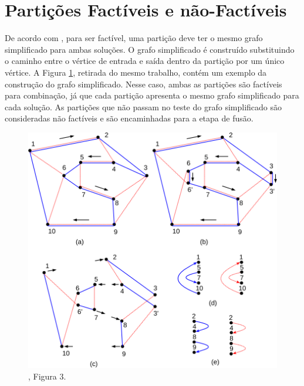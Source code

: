 \documentclass[
	article,			%
	11pt,				%
	oneside,			%
	a4paper,			%
	english,			%
	brazil,				%
	sumario=tradicional
	]{abntex2}
\begin{document}

\frenchspacing 


%
%
\maketitle


\textual

\section{Partições Factíveis e não-Factíveis}

De acordo com , para ser factível, uma partição deve ter o mesmo grafo simplificado para ambas soluções. O grafo simplificado é construído substituindo o caminho entre o vértice de entrada e saída dentro da partição por um único vértice. A Figura \ref{fig-1}, retirada do mesmo trabalho, contém um exemplo da construção do grafo simplificado. Nesse caso, ambas as partições são factíveis para combinação, já que cada partição apresenta o mesmo grafo simplificado para cada solução. As partições que não passam no teste do grafo simplificado são consideradas não factíveis e são encaminhadas para a etapa de fusão.

\begin{figure}[tbph!]
	\centering
	\includegraphics[width=0.7\linewidth]{fig-1}
	\caption{, Figura 3.}
	\label{fig-1}
\end{figure}
\end{document}
